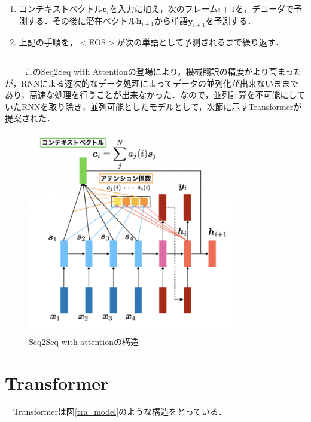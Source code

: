\documentclass[a4j, 11pt]{jsarticle}
\numberwithin{equation}{section}
\begin{document}
\begin{enumerate}
\item コンテキストベクトル$\mathbf{c}_i$を入力に加え，次のフレーム$i+1$を，デコーダで予測する．その後に潜在ベクトル$\mathbf{h}_{i+1}$から単語$\mathbf{y}_{i+1}$を予測する．\\

\item 上記の手順を，$<$EOS$>$が次の単語として予測されるまで繰り返す．

\end{enumerate}
\hrule height 0.3mm depth 0.3mm width 140mm
\vspace{5mm}　
　このSeq2Seq with Attentionの登場により，機械翻訳の精度がより高まったが，RNNによる逐次的なデータ処理によってデータの並列化が出来ないままであり，高速な処理を行うことが出来なかった．なので，並列計算を不可能にしていたRNNを取り除き，並列可能としたモデルとして，次節に示すTransformerが提案された．\\

\begin{figure}[H]
\centering
\includegraphics[width=9cm]{seq2seq_with_attention_model.png}
\caption{Seq2Seq with attentionの構造}
\label{seq_attention}
\end{figure}

\newpage
\section{Transformer}
　Transformerは図\ref{tra_model}のような構造をとっている．
\end{document}
